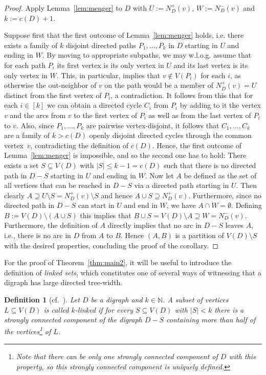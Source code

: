 \documentclass[a4paper,10pt]{article}
\newtheorem{definition}{Definition}
\begin{document}
\begin{proof}
    Apply Lemma~\ref{lem:menger} to $D$ with $U:=N_D^+(v)$, $W:=N_D^-(v)$ and $k:=c(D)+1$. 
    
    Suppose first that the first outcome of Lemma~\ref{lem:menger} holds, i.e. there exists a family of $k$ disjoint directed paths $P_1,\ldots,P_k$ in $D$ starting in $U$ and ending in $W$. By moving to appropriate subpaths, we may w.l.o.g. assume that for each path $P_i$ its first vertex is its only vertex in $U$ and its last vertex is its only vertex in $W$. This, in particular, implies that $v\notin V(P_i)$ for each $i$, as otherwise the out-neighbor of $v$ on the path would be a member of $N_D^+(v)=U$ distinct from the first vertex of $P_i$, a contradiction. It follows from this that for each $i\in [k]$ we can obtain a directed cycle $C_i$ from $P_i$ by adding to it the vertex $v$ and the arcs from $v$ to the first vertex of $P_i$ as well as from the last vertex of $P_i$ to $v$. Also, since $P_1,\ldots,P_k$ are pairwise vertex-disjoint, it follows that $C_1,\ldots,C_k$ are a family of $k>c(D)$ openly disjoint directed cycles through the common vertex~$v$, contradicting the definition of $c(D)$. Hence, the first outcome of Lemma~\ref{lem:menger} is impossible, and so the second one has to hold: There exists a set $S\subseteq V(D)$ with $|S|\le k-1=c(D)$ such that there is no directed path in $D-S$ starting in $U$ and ending in $W$. Now let $A$ be defined as the set of all vertices that can be reached in $D-S$ via a directed path starting in $U$. Then clearly $A\supseteq U\setminus S=N_D^+(v)\setminus S$ and hence $A\cup S\supseteq N_D^+(v)$. Furthermore, since no directed path in $D-S$ can start in $U$ and end in $W$, we have $A\cap W=\emptyset$. Defining $B:=V(D)\setminus (A\cup S)$ this implies that $B\cup S=V(D)\setminus A\supseteq W=N_D^-(v)$. Furthermore, the definition of $A$ directly implies that no arc in $D-S$ leaves $A$, i.e., there is no arc in $D$ from $A$ to $B$. Hence $(A,B)$ is a partition of $V(D)\setminus S$ with the desired properties, concluding the proof of the corollary.
\end{proof}

For the proof of Theorem~\ref{thm:main2}, it will be useful to introduce the definition of \emph{linked sets}, which constitutes one of several ways of witnessing that a digraph has large directed tree-width.

\begin{definition}[cf.~\cite{MR1966425}]
Let $D$ be a digraph and $k\in  \mathbb{N}$. A subset of vertices $L\subseteq V(D)$ is called \emph{$k$-linked} if for every $S\subseteq V(D)$ with $|S|<k$ there is a strongly connected component of the digraph $D-S$ containing more than half of the vertices\footnote{Note that there can be only one strongly connected component of $D$ with this property, so this strongly connected component is uniquely defined.} of $L$.
\end{definition}
\end{document}
